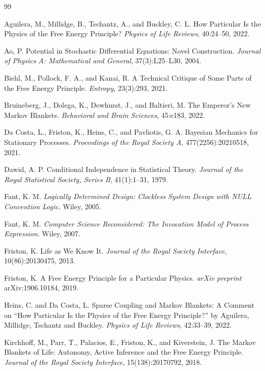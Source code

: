\documentclass[11pt]{article}
\theoremstyle{definition}
\begin{document}
\begin{thebibliography}{99}

 Aguilera, M., Millidge, B., Tschantz, A., and Buckley, C. L. How Particular Is the Physics of the Free Energy Principle? \emph{Physics of Life Reviews}, 40:24--50, 2022.

 Ao, P. Potential in Stochastic Differential Equations: Novel Construction. \emph{Journal of Physics A: Mathematical and General}, 37(3):L25--L30, 2004.

 Biehl, M., Pollock, F. A., and Kanai, R. A Technical Critique of Some Parts of the Free Energy Principle. \emph{Entropy}, 23(3):293, 2021.

 Bruineberg, J., Dolega, K., Dewhurst, J., and Baltieri, M. The Emperor's New Markov Blankets. \emph{Behavioral and Brain Sciences}, 45:e183, 2022.

 Da Costa, L., Friston, K., Heins, C., and Pavliotis, G. A. Bayesian Mechanics for Stationary Processes. \emph{Proceedings of the Royal Society A}, 477(2256):20210518, 2021.

 Dawid, A. P. Conditional Independence in Statistical Theory. \emph{Journal of the Royal Statistical Society, Series B}, 41(1):1--31, 1979.

 Fant, K. M. \emph{Logically Determined Design: Clockless System Design with NULL Convention Logic}. Wiley, 2005.

 Fant, K. M. \emph{Computer Science Reconsidered: The Invocation Model of Process Expression}. Wiley, 2007.

 Friston, K. Life as We Know It. \emph{Journal of the Royal Society Interface}, 10(86):20130475, 2013.

 Friston, K. A Free Energy Principle for a Particular Physics. \emph{arXiv preprint} arXiv:1906.10184, 2019.

 Heins, C. and Da Costa, L. Sparse Coupling and Markov Blankets: A Comment on ``How Particular Is the Physics of the Free Energy Principle?'' by Aguilera, Millidge, Tschantz and Buckley. \emph{Physics of Life Reviews}, 42:33--39, 2022.

 Kirchhoff, M., Parr, T., Palacios, E., Friston, K., and Kiverstein, J. The Markov Blankets of Life: Autonomy, Active Inference and the Free Energy Principle. \emph{Journal of the Royal Society Interface}, 15(138):20170792, 2018.


\end{thebibliography}
\end{document}
